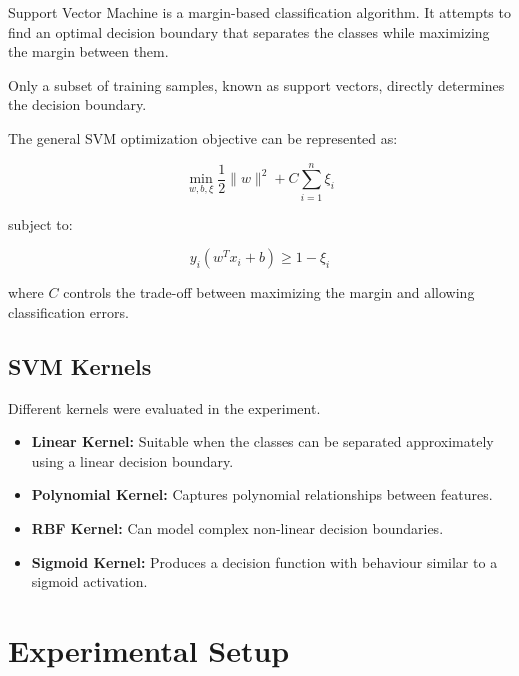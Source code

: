 \documentclass[12pt,a4paper]{article}
\begin{document}
Support Vector Machine is a margin-based classification algorithm.
It attempts to find an optimal decision boundary that separates the
classes while maximizing the margin between them.

Only a subset of training samples, known as support vectors,
directly determines the decision boundary.

The general SVM optimization objective can be represented as:

\[
\min_{w,b,\xi}
\frac{1}{2}\|w\|^2
+
C\sum_{i=1}^{n}\xi_i
\]

subject to:

\[
y_i(w^Tx_i+b)\geq1-\xi_i
\]

where $C$ controls the trade-off between maximizing the margin and
allowing classification errors.


\subsection{SVM Kernels}

Different kernels were evaluated in the experiment.

\begin{itemize}
    \item \textbf{Linear Kernel:} Suitable when the classes can be
    separated approximately using a linear decision boundary.
    
    \item \textbf{Polynomial Kernel:} Captures polynomial relationships
    between features.
    
    \item \textbf{RBF Kernel:} Can model complex non-linear decision
    boundaries.
    
    \item \textbf{Sigmoid Kernel:} Produces a decision function with
    behaviour similar to a sigmoid activation.
\end{itemize}


\section{Experimental Setup}
\end{document}
